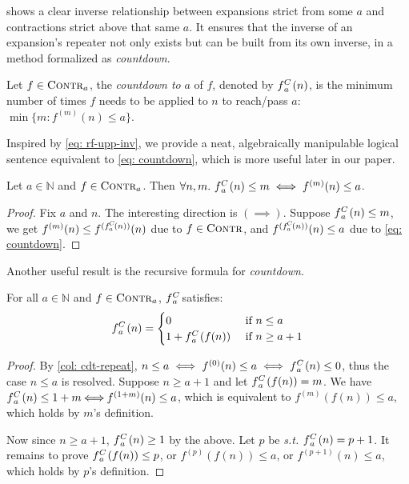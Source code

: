  shows a clear inverse relationship between expansions strict from some $a$ and contractions strict above that same $a$. It ensures that the inverse of an expansion's repeater not only exists but can be built from its own inverse, in a method formalized as \emph{countdown}.
\begin{defn} \label{defn: informal-countdown} \label{eq: countdown}
Let $f\in \text{\scshape{Contr}}_a$, the \textit{countdown to} $a$ of $f$, denoted by $\cdt{f}{a}(n)$, is the minimum number of times $f$ needs to be applied to $n$ to reach/pass $a$: 
$\min\{m: f^{(m)}(n)\le a \}$.
\end{defn}
Inspired by \eqref{eq: rf-upp-inv}, we provide a neat, algebraically manipulable logical sentence equivalent to \eqref{eq: countdown}, which is more useful later in our paper.
\begin{col} \label{col: cdt-repeat}
Let $a \in \mathbb{N}$ and $f\in \text{\scshape{Contr}}_{a}$.  Then $\forall n, m.~ \cdt{f}{a}(n)\le m \iff f^{(m)}(n)\le a$.
\end{col}
\begin{proof}
	Fix $a$ and $n$. The interesting direction is $(\!\!\implies\!\!)$. Suppose $\cdt{f}{a}(n)\le m$, we get $f^{(m)}(n)\le f^{(\cdt{f}{a}(n))}(n)$ due to $f\in \text{\scshape{Contr}}$, and $f^{(\cdt{f}{a}(n))}(n)\le a$ due to \cref{eq: countdown}.
\end{proof}
Another useful result is the recursive formula for \emph{countdown}.
\begin{thm} \label{thm: cdt-recursion}
	For all $a\in \mathbb{N}$ and $f\in \text{\scshape{Contr}}_{a}$, $\cdt{f}{a}$ satisfies:
	\begin{equation*}
	\cdt{f}{a}(n) = \begin{cases}
	0 & \text{ if } n \le a \\ 1 + \cdt{f}{a}(f(n)) & \text{ if } n \ge a + 1
	\end{cases}
	\end{equation*}
\end{thm}
\begin{proof}
By \cref{col: cdt-repeat}, $n\le a \iff f^{(0)}(n)\le a \iff \cdt{f}{a}(n)\le 0$, thus the case $n\le a$ is resolved. Suppose $n\ge a+1$ and let $\cdt{f}{a}(f(n)) = m$. We have $\cdt{f}{a}(n)\le 1+m \!\! \iff \!\! f^{(1+m)}(n) \le a$, which is equivalent to $f^{(m)}(f(n)) \le a$, which holds by $m$'s definition.

Now since $n\ge a+1$, $\cdt{f}{a}(n)\ge 1$ by the above. Let $p$ be \emph{s.t.} $\cdt{f}{a}(n) = p+1$. It remains to prove $\cdt{f}{a}(f(n))\le p$, or $f^{(p)}(f(n))\le a$, or $f^{(p+1)}(n)\le a$, which holds by $p$'s definition.
\end{proof}

